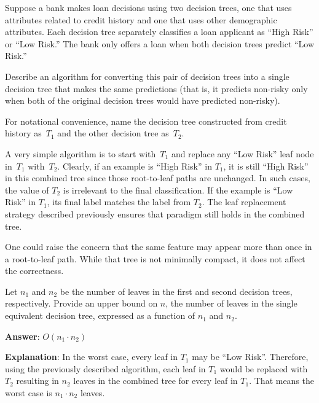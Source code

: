 \begin{problem}
  Suppose a bank makes loan decisions using two decision trees, one that uses attributes related to credit history and one that uses other demographic attributes. Each decision tree separately classifies a loan applicant as “High Risk” or “Low Risk.” The bank only offers a loan when both decision trees predict “Low Risk.”
\end{problem}

\begin{subproblem}
  Describe an algorithm for converting this pair of decision trees into a single decision tree that makes the same predictions (that is, it predicts non-risky only when both of the original decision trees would have predicted non-risky).
\end{subproblem}

For notational convenience, name the decision tree constructed from credit history as~$T_1$ and the other decision tree as~$T_2$.

A very simple algorithm is to start with~$T_1$ and replace any ``Low Risk'' leaf node in~$T_1$ with~$T_2$.  Clearly, if an example is ``High Risk'' in $T_1$, it is still ``High Risk'' in this combined tree since those root-to-leaf paths are unchanged.  In such cases, the value of $T_2$ is irrelevant to the final classification.  If the example is ``Low Risk'' in $T_1$, its final label matches the label from $T_2$.  The leaf replacement strategy described previously ensures that paradigm still holds in the combined tree.

One could raise the concern that the same feature may appear more than once in a root-to-leaf path.  While that tree is not minimally compact, it does not affect the correctness.

\begin{subproblem}
  Let $n_1$ and $n_2$ be the number of leaves in the first and second decision trees, respectively. Provide an upper bound on $n$, the number of leaves in the single equivalent decision tree, expressed as a function of $n_1$ and $n_2$.
\end{subproblem}

\noindent
\textbf{Answer}: $\boxed{O(n_1 \cdot n_2)}$

\noindent
\textbf{Explanation}: In the worst case, every leaf in $T_1$ may be ``Low Risk''.  Therefore, using the previously described algorithm, each leaf in $T_1$ would be replaced with $T_2$ resulting in $n_2$ leaves in the combined tree for every leaf in $T_1$.  That means the worst case is $n_1\cdot n_2$ leaves.
